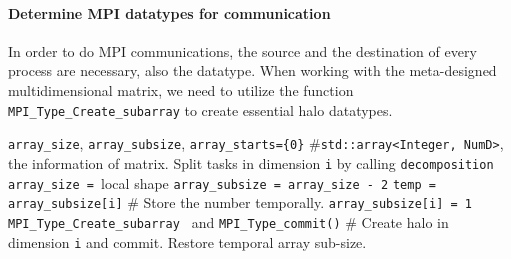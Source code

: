 \paragraph{Determine MPI datatypes for communication}
In order to do MPI communications, the source and the destination of every process are necessary, also the datatype.
When working with the meta-designed multidimensional matrix, we need to utilize the function \texttt{MPI\_Type\_Create\_subarray} to 
create essential halo datatypes.
\begin{algorithm}
  \begin{algorithmic}[1]
    \STATE \texttt{array\_size}, \texttt{array\_subsize}, \texttt{array\_starts=\{0\}} \hfill \#\texttt{std::array<Integer, NumD>}, the information of matrix.
      \STATE Split tasks in dimension \texttt{i} by calling \texttt{decomposition}
      \STATE \texttt{array\_size = }local shape
      \STATE \texttt{array\_subsize = array\_size - 2}
    \ENDFOR
      \STATE \texttt{temp = array\_subsize[i]} \hfill \# Store the number temporally.
      \STATE \texttt{array\_subsize[i] = 1}
      \STATE \texttt{MPI\_Type\_Create\_subarray
      } and \texttt{MPI\_Type\_commit()} \hfill \# Create halo in dimension \texttt{i} and commit.
      \STATE Restore temporal array sub-size.
    \ENDFOR
  \end{algorithmic}
\end{algorithm}

